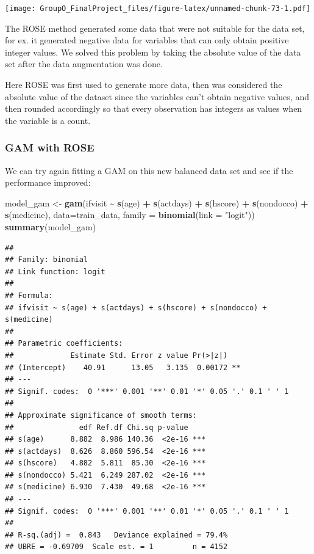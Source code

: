 \documentclass[
]{article}
\newenvironment{Shaded}{\begin{snugshade}}{\end{snugshade}}
\newcommand{\AttributeTok}[1]{\textcolor[rgb]{0.13,0.29,0.53}{#1}}
\newcommand{\FunctionTok}[1]{\textcolor[rgb]{0.13,0.29,0.53}{\textbf{#1}}}
\newcommand{\NormalTok}[1]{#1}
\newcommand{\OtherTok}[1]{\textcolor[rgb]{0.56,0.35,0.01}{#1}}
\newcommand{\SpecialCharTok}[1]{\textcolor[rgb]{0.81,0.36,0.00}{\textbf{#1}}}
\newcommand{\StringTok}[1]{\textcolor[rgb]{0.31,0.60,0.02}{#1}}
\begin{document}
\texttt{[image: GroupO\_FinalProject\_files/figure-latex/unnamed-chunk-73-1.pdf]}

The ROSE method generated some data that were not suitable for the data
set, for ex. it generated negative data for variables that can only
obtain positive integer values. We solved this problem by taking the
absolute value of the data set after the data augmentation was done.

Here ROSE was first used to generate more data, then was considered the
absolute value of the dataset since the variables can't obtain negative
values, and then rounded accordingly so that every observation has
integers as values when the variable is a count.

\subsubsection{GAM with ROSE}\label{gam-with-rose}

We can try again fitting a GAM on this new balanced data set and see if
the performance improved:

\begin{Shaded}
\begin{Highlighting}[]
\NormalTok{model\_gam }\OtherTok{\textless{}{-}} \FunctionTok{gam}\NormalTok{(ifvisit }\SpecialCharTok{\textasciitilde{}} \FunctionTok{s}\NormalTok{(age) }\SpecialCharTok{+} \FunctionTok{s}\NormalTok{(actdays) }\SpecialCharTok{+} \FunctionTok{s}\NormalTok{(hscore) }\SpecialCharTok{+} \FunctionTok{s}\NormalTok{(nondocco) }\SpecialCharTok{+} \FunctionTok{s}\NormalTok{(medicine), }\AttributeTok{data=}\NormalTok{train\_data, }\AttributeTok{family =} \FunctionTok{binomial}\NormalTok{(}\AttributeTok{link =} \StringTok{"logit"}\NormalTok{))}
\FunctionTok{summary}\NormalTok{(model\_gam)}
\end{Highlighting}
\end{Shaded}

\begin{verbatim}
## 
## Family: binomial 
## Link function: logit 
## 
## Formula:
## ifvisit ~ s(age) + s(actdays) + s(hscore) + s(nondocco) + s(medicine)
## 
## Parametric coefficients:
##             Estimate Std. Error z value Pr(>|z|)   
## (Intercept)    40.91      13.05   3.135  0.00172 **
## ---
## Signif. codes:  0 '***' 0.001 '**' 0.01 '*' 0.05 '.' 0.1 ' ' 1
## 
## Approximate significance of smooth terms:
##               edf Ref.df Chi.sq p-value    
## s(age)      8.882  8.986 140.36  <2e-16 ***
## s(actdays)  8.626  8.860 596.54  <2e-16 ***
## s(hscore)   4.882  5.811  85.30  <2e-16 ***
## s(nondocco) 5.421  6.249 287.02  <2e-16 ***
## s(medicine) 6.930  7.430  49.68  <2e-16 ***
## ---
## Signif. codes:  0 '***' 0.001 '**' 0.01 '*' 0.05 '.' 0.1 ' ' 1
## 
## R-sq.(adj) =  0.843   Deviance explained = 79.4%
## UBRE = -0.69709  Scale est. = 1         n = 4152
\end{verbatim}
\end{document}

